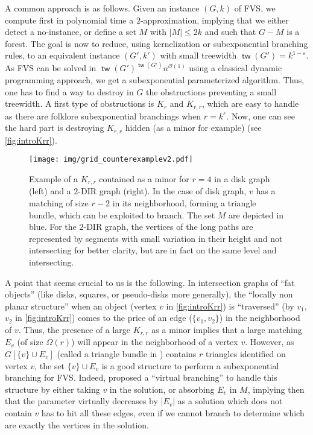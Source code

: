\documentclass{amsart}
\newcommand{\eps}{\varepsilon}
\DeclareMathOperator\tw{\textsf{tw}}
\newcommand{\FVS}{\textsc{FVS}\xspace}
\renewcommand{\O}{\mathcal{O}}
\begin{document}
A common approach is as follows.
Given an instance $(G,k)$ of \FVS, we compute first in polynomial time a $2$-approximation, implying that we either detect a no-instance, or define a set $M$ with $|M|\le 2k$ and such that $G-M$ is a forest.
The goal is now to reduce, using kernelization or subexponential branching rules, to an equivalent instance $(G',k')$ with small treewidth $\tw(G')=k^{1-\eps}$. As \FVS can be solved in $\tw(G')^{\tw(G')}n^{\O(1)}$ using a classical dynamic programming approach, we get a subexponential parameterized algorithm.
Thus, one has to find a way to destroy in $G$ the obstructions preventing a small treewidth.
A first type of obstructions is $K_r$ and $K_{r,r}$, which are easy to handle as there are folklore subexponential branchings when $r=k^{\eps}$.
Now, one can see the hard part is destroying $K_{r,r}$
hidden (as a minor for example) (see \autoref{fig:introKrr}). 

\begin{figure}[!ht]
    \centering
    \texttt{[image: img/grid\_counterexamplev2.pdf]}
    \caption{Example of a $K_{r,r}$ contained as a minor for $r=4$ in a disk graph (left) and a $2$-DIR graph (right). In the case of disk graph, $v$ has a matching of size $r-2$ in its neighborhood, forming a triangle bundle, which can be exploited to branch. The set $M$ are depicted in blue. For the $2$-DIR graph, the vertices of the long paths are represented by segments with small variation in their height and not intersecting for better clarity, but are in fact on the same level and intersecting. }
    \label{fig:introKrr}
\end{figure}

A point that seems crucial to us is the following.
In intersection graphs of ``fat objects'' (like disks, squares, or pseudo-disks more generally), 
the ``locally non planar structure'' when an object (vertex $v$ in \autoref{fig:introKrr}) is ``traversed'' (by $v_1$, $v_2$ in \autoref{fig:introKrr})
comes to the price of an edge ($\{v_1,v_2\}$) in the neighborhood of $v$.
Thus, the presence of a large $K_{r,r}$ as a minor implies that a large matching $E_v$ (of size $\Omega(r)$) will appear in the neighborhood of a vertex $v$.
However, as $G[\{v\} \cup E_v]$ (called a triangle bundle in \cite{Lokshtanov23Approx}) contains $r$ triangles identified on vertex $v$, the set $\{v\} \cup E_v$ is a good structure to perform a subexponential branching for \FVS. Indeed, \cite{lokSODA22} proposed a ``virtual branching'' to handle this structure by either taking $v$ in the solution, or absorbing $E_v$ in $M$, implying then that the parameter virtually decreases by $|E_v|$ as a solution which does not contain $v$ has to hit all these edges, even if we cannot branch to determine which are exactly the vertices in the solution.
\end{document}
